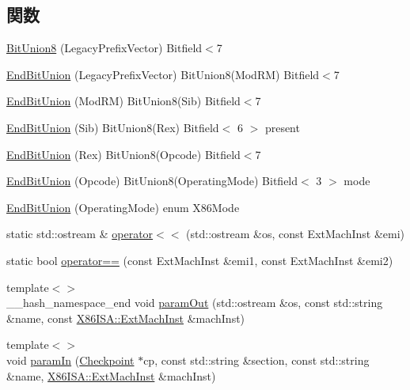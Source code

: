 \subsection*{関数}
\begin{DoxyCompactItemize}
\item 
\hyperlink{namespaceX86ISA_ad30679aa4800b378176d7d464eb5df97}{BitUnion8} (LegacyPrefixVector) Bitfield$<$7
\item 
\hyperlink{namespaceX86ISA_a8868c98c46358c493fc04e89771d8c73}{EndBitUnion} (LegacyPrefixVector) BitUnion8(ModRM) Bitfield$<$7
\item 
\hyperlink{namespaceX86ISA_a142b63108443fe0184a873a564a9762e}{EndBitUnion} (ModRM) BitUnion8(Sib) Bitfield$<$7
\item 
\hyperlink{namespaceX86ISA_a8cf6dc92323e70f74dd36007b5511023}{EndBitUnion} (Sib) BitUnion8(Rex) Bitfield$<$ 6 $>$ present
\item 
\hyperlink{namespaceX86ISA_a55b670a53f749beaf53363e80f49bdaa}{EndBitUnion} (Rex) BitUnion8(Opcode) Bitfield$<$7
\item 
\hyperlink{namespaceX86ISA_a7a403bd01ec592764b6f32eb899ddb93}{EndBitUnion} (Opcode) BitUnion8(OperatingMode) Bitfield$<$ 3 $>$ mode
\item 
\hyperlink{namespaceX86ISA_adc02755269202e7fd36d177fb540c2d2}{EndBitUnion} (OperatingMode) enum X86Mode
\item 
static std::ostream \& \hyperlink{namespaceX86ISA_a1c0edac96eed6e133103cbbc46effa5a}{operator$<$$<$} (std::ostream \&os, const ExtMachInst \&emi)
\item 
static bool \hyperlink{namespaceX86ISA_abe769e58d28aff27ee71564bb6f6b0c0}{operator==} (const ExtMachInst \&emi1, const ExtMachInst \&emi2)
\item 
{\footnotesize template$<$$>$ }\\\_\-\_\-hash\_\-namespace\_\-end void \hyperlink{arch_2x86_2types_8hh_abd04feaf49e2ec8adbaa8f70d71f37a6}{paramOut} (std::ostream \&os, const std::string \&name, const \hyperlink{structX86ISA_1_1ExtMachInst}{X86ISA::ExtMachInst} \&machInst)
\item 
{\footnotesize template$<$$>$ }\\void \hyperlink{arch_2x86_2types_8hh_a9b3a414227099849bc16482eceea5b20}{paramIn} (\hyperlink{classCheckpoint}{Checkpoint} $\ast$cp, const std::string \&section, const std::string \&name, \hyperlink{structX86ISA_1_1ExtMachInst}{X86ISA::ExtMachInst} \&machInst)
\end{DoxyCompactItemize}
